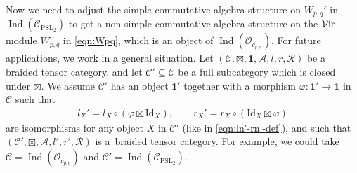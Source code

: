 \documentclass[pdftex]{sigma}
\numberwithin{equation}{section}
\theoremstyle{definition}
\begin{document}
Now we need to adjust the simple commutative algebra structure on $W_{p,q}'$ in $\operatorname{Ind}(\mathcal{C}_{\mathrm{PSL}_2})$ to get a non-simple commutative algebra structure on the $\mathcal{V}{\rm ir}$-module $W_{p,q}$ in \eqref{eqn:Wpq}, which is an object of $\operatorname{Ind}(\mathcal{O}_{c_{p,q}})$. For future applications, we work in a general situation. Let $(\mathcal{C},\boxtimes,\mathbf{1},\mathcal{A},l,r,\mathcal{R})$ be a braided tensor category, and let $\mathcal{C}'\subseteq\mathcal{C}$ be a full subcategory which is closed under $\boxtimes$. We assume $\mathcal{C}'$ has an object $\mathbf{1}'$ together with a morphism $\varphi\colon \mathbf{1}'\rightarrow\mathbf{1}$ in $\mathcal{C}$ such that
\begin{gather}\label{eqn:l'-r'-gen-def}
l_X' = l_X\circ(\varphi\boxtimes\mathrm{Id}_X),\qquad r_X'=r_X\circ(\mathrm{Id}_X\boxtimes\varphi)
\end{gather}
are isomorphisms for any object $X$ in $\mathcal{C}'$ (like in \eqref{eqn:ln'-rn'-def}), and such that
 $(\mathcal{C}',\boxtimes,\mathcal{A},l',r',\mathcal{R})$ is a~braided tensor category. For example, we could take $\mathcal{C}=\operatorname{Ind}(\mathcal{O}_{c_{p,q}})$ and $\mathcal{C}'=\operatorname{Ind}(\mathcal{C}_{\mathrm{PSL}_2})$.
\end{document}

